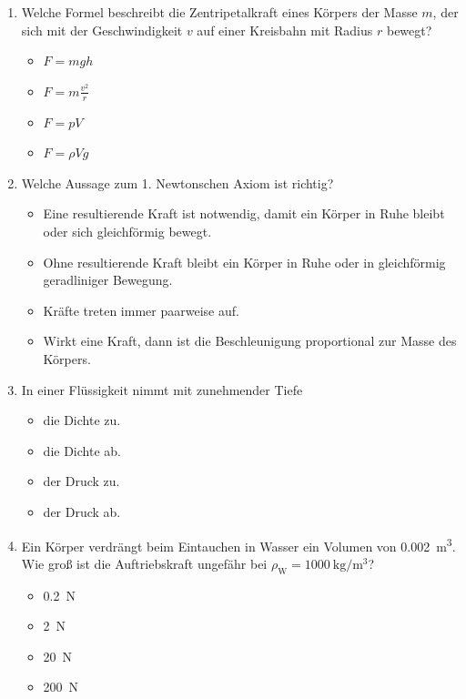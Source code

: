 \documentclass[11pt, a4paper]{article}
\begin{document}
\begin{enumerate}[label=\arabic*.,itemsep=18pt]
    \item Welche Formel beschreibt die Zentripetalkraft eines Körpers der Masse $m$, der sich mit der Geschwindigkeit $v$ auf einer Kreisbahn mit Radius $r$ bewegt?
    \begin{itemize}[label={$\square$},itemsep=1pt,topsep=0pt]
        \item $F = m g h$
        \item $F = m \frac{v^2}{r}$
        \item $F = pV$
        \item $F = \rho V g$
    \end{itemize}

    \item Welche Aussage zum 1. Newtonschen Axiom ist richtig?
    \begin{itemize}[label={$\square$},itemsep=1pt,topsep=0pt]
        \item Eine resultierende Kraft ist notwendig, damit ein Körper in Ruhe bleibt oder sich gleichförmig bewegt.
        \item Ohne resultierende Kraft bleibt ein Körper in Ruhe oder in gleichförmig geradliniger Bewegung.
        \item Kräfte treten immer paarweise auf.
        \item Wirkt eine Kraft, dann ist die Beschleunigung proportional zur Masse des Körpers.
    \end{itemize}

    \item In einer Flüssigkeit nimmt mit zunehmender Tiefe 
    \begin{itemize}[label={$\square$},itemsep=1pt,topsep=0pt]
        \item die Dichte zu.
        \item die Dichte ab.
        \item der Druck zu.
        \item der Druck ab.
    \end{itemize}

    \item Ein Körper verdrängt beim Eintauchen in Wasser ein Volumen von \SI{0.002}{\metre\cubed}. Wie groß ist die Auftriebskraft ungefähr bei $\rho_{\text{W}} = \SI{1000}{\kilogram\per\metre\cubed}$?
    \begin{itemize}[label={$\square$},itemsep=1pt,topsep=0pt]
        \item \SI{0.2}{\newton}
        \item \SI{2}{\newton}
        \item \SI{20}{\newton}
        \item \SI{200}{\newton}
    \end{itemize}


\end{enumerate}
\end{document}
